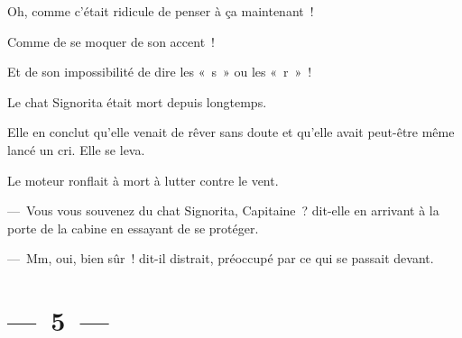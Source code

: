 \documentclass[twoside]{book} %
\begin{document}
Oh, comme c’était ridicule de penser à ça maintenant !\par
Comme de se moquer de son accent !\par
Et de son impossibilité de dire les « s » ou les « r » !\par
Le chat Signorita était mort depuis longtemps.\par
Elle en conclut qu’elle venait de rêver sans doute et qu’elle avait peut-être même lancé un cri. Elle se leva.\par
Le moteur ronflait à mort à lutter contre le vent.\par
— Vous vous souvenez du chat Signorita, Capitaine ? dit-elle en arrivant à la porte de la cabine en essayant de se protéger.\par
— Mm, oui, bien sûr ! dit-il distrait, préoccupé par ce qui se passait devant.

\section[{— 5 —}]{— 5 —}
\renewcommand{\leftmark}{— 5 —}
\end{document}
